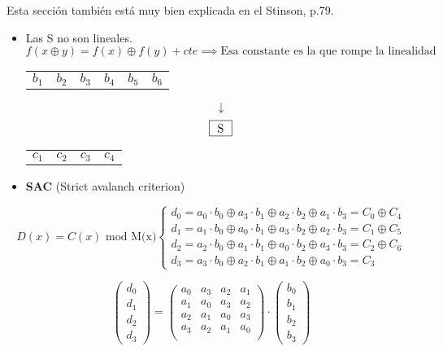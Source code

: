 Esta sección también está muy bien explicada en el Stinson, p.79.

\begin{itemize}
	\item Las S no son lineales.
	$$f(x \oplus y) = f(x) \oplus f(y) + cte \implies \text{Esa constante es la que rompe la linealidad}$$
	
	\begin{example}
		\begin{center}
			\begin{tabular}{r  r  r  r  r  r }
				$b_1$ & $b_2$ & $b_3$ & $b_4$ & $b_5$ & $b_6$
			\end{tabular}
		\end{center}
		$$\downarrow$$
		$$\fbox{\textbf{     }S\textbf{     }}$$
		\begin{center}
			\begin{tabular}{r  r  r  r }
				$c_1$ & $c_2$ & $c_3$ & $c_4$
			\end{tabular}
		\end{center}
		
		
	\end{example}
	
	\item \textbf{SAC} (Strict avalanch criterion)
	
\end{itemize} 
 
 
 $$D(x) = C(x) \text{ mod M(x)} \begin{cases}
 d_0 = a_0\cdot b_0 \oplus a_3 \cdot b_1 \oplus a_2 \cdot b_2 \oplus a_1 \cdot b_3 = C_0 \oplus C_4\\
 d_1 = a_1\cdot b_0 \oplus a_0 \cdot b_1 \oplus a_3 \cdot b_2 \oplus a_2 \cdot b_3 = C_1 \oplus C_5\\
 d_2 = a_2\cdot b_0 \oplus a_1 \cdot b_1 \oplus a_0 \cdot b_2 \oplus a_3 \cdot b_3 = C_2 \oplus C_6\\
 d_3 = a_3\cdot b_0 \oplus a_2 \cdot b_1 \oplus a_1 \cdot b_2 \oplus a_0 \cdot b_3 = C_3
 \end{cases}$$
 
 $$\left(\begin{matrix}
 d_0\\d_1\\d_2\\d_3
 \end{matrix} \right) = \left(\begin{matrix}
 a_0 & a_3 & a_2 & a_1\\
 a_1 & a_0 & a_3 & a_2\\
 a_2 & a_1 & a_0 & a_3\\
 a_3 & a_2 & a_1 & a_0\\
 \end{matrix}\right) \cdot \left( \begin{matrix}
 b_0\\
 b_1\\
 b_2\\
 b_3
 \end{matrix}\right)$$
 
